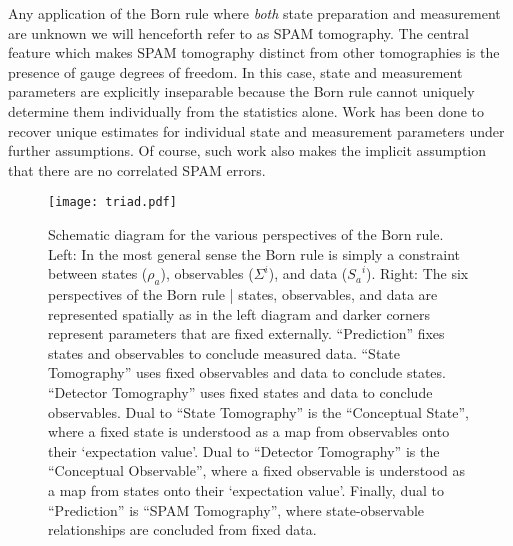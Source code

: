 \documentclass[pra, 10pt, notitlepage, twocolumn]{revtex4-1}
\begin{document}
Any application of the Born rule where \emph{both} state preparation and measurement are unknown \cite{merkel,gst,stark} we will henceforth refer to as SPAM tomography.
The central feature which makes SPAM tomography distinct from other tomographies is the presence of gauge degrees of freedom.
In this case, state and measurement parameters are explicitly inseparable because the Born rule cannot uniquely determine them individually from the statistics alone.
Work has been done to recover unique estimates for individual state and measurement parameters \cite{stark} under further assumptions.
Of course, such work also makes the implicit assumption that there are no correlated SPAM errors.

\begin{widetext}

\begin{figure}[h!]
\centering
\texttt{[image: triad.pdf]}
\caption{
Schematic diagram for the various perspectives of the Born rule.
Left: In the most general sense the Born rule is simply a constraint between states ($\rho_a$), observables ($\Sigma^i$), and data (${S_a}^i$).
Right: The six perspectives of the Born rule | states, observables, and data are represented spatially as in the left diagram and darker corners represent parameters that are fixed externally.
``Prediction'' fixes states and observables to conclude measured data.  ``State Tomography'' uses fixed observables and data to conclude states.  ``Detector Tomography'' uses fixed states and data to conclude observables.
Dual to ``State Tomography'' is the ``Conceptual State'', where a fixed state is understood as a map from observables onto their `expectation value'.
Dual to ``Detector Tomography'' is the ``Conceptual Observable'', where a fixed observable is understood as a map from states onto their `expectation value'.
Finally, dual to ``Prediction'' is ``SPAM Tomography'', where state-observable relationships are concluded from fixed data.
}\label{triad}
\end{figure}

\end{widetext}
\end{document}
